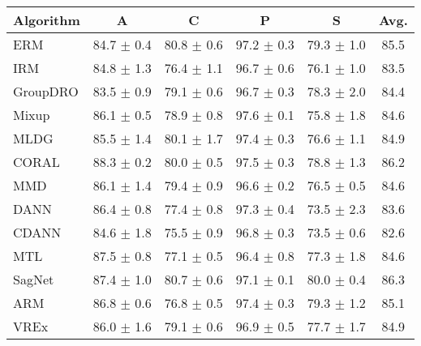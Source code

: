 \begin{table*}
\begin{center}
\begin{tabular}{lccccc}
\toprule
\textbf{Algorithm}   & \textbf{A}           & \textbf{C}           & \textbf{P}           & \textbf{S}           & \textbf{Avg.}         \\
\midrule
ERM                  & 84.7 $\pm$ 0.4       & 80.8 $\pm$ 0.6       & 97.2 $\pm$ 0.3       & 79.3 $\pm$ 1.0       & 85.5                 \\
IRM                  & 84.8 $\pm$ 1.3       & 76.4 $\pm$ 1.1       & 96.7 $\pm$ 0.6       & 76.1 $\pm$ 1.0       & 83.5                 \\
GroupDRO             & 83.5 $\pm$ 0.9       & 79.1 $\pm$ 0.6       & 96.7 $\pm$ 0.3       & 78.3 $\pm$ 2.0       & 84.4                 \\
Mixup                & 86.1 $\pm$ 0.5       & 78.9 $\pm$ 0.8       & 97.6 $\pm$ 0.1       & 75.8 $\pm$ 1.8       & 84.6                 \\
MLDG                 & 85.5 $\pm$ 1.4       & 80.1 $\pm$ 1.7       & 97.4 $\pm$ 0.3       & 76.6 $\pm$ 1.1       & 84.9                 \\
CORAL                & 88.3 $\pm$ 0.2       & 80.0 $\pm$ 0.5       & 97.5 $\pm$ 0.3       & 78.8 $\pm$ 1.3       & 86.2                 \\
MMD                  & 86.1 $\pm$ 1.4       & 79.4 $\pm$ 0.9       & 96.6 $\pm$ 0.2       & 76.5 $\pm$ 0.5       & 84.6                 \\
DANN                 & 86.4 $\pm$ 0.8       & 77.4 $\pm$ 0.8       & 97.3 $\pm$ 0.4       & 73.5 $\pm$ 2.3       & 83.6                 \\
CDANN                & 84.6 $\pm$ 1.8       & 75.5 $\pm$ 0.9       & 96.8 $\pm$ 0.3       & 73.5 $\pm$ 0.6       & 82.6                 \\
MTL                  & 87.5 $\pm$ 0.8       & 77.1 $\pm$ 0.5       & 96.4 $\pm$ 0.8       & 77.3 $\pm$ 1.8       & 84.6                 \\
SagNet               & 87.4 $\pm$ 1.0       & 80.7 $\pm$ 0.6       & 97.1 $\pm$ 0.1       & 80.0 $\pm$ 0.4       & 86.3                 \\
ARM                  & 86.8 $\pm$ 0.6       & 76.8 $\pm$ 0.5       & 97.4 $\pm$ 0.3       & 79.3 $\pm$ 1.2       & 85.1                 \\
VREx                 & 86.0 $\pm$ 1.6       & 79.1 $\pm$ 0.6       & 96.9 $\pm$ 0.5       & 77.7 $\pm$ 1.7       & 84.9                 \\

\end{tabular}
\end{center}
\end{table*}
